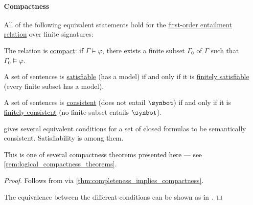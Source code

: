 \paragraph{Compactness}

\begin{theorem}\label{thm:fol_semantic_compactness}
  All of the following equivalent statements hold for the \hyperref[def:fol_semantics/entailment]{first-order entailment relation} over finite signatures:
  \begin{thmenum}
     The relation is \hyperref[def:consequence_relation/compactness]{compact}: if \( \Gamma \vDash \varphi \), there exists a finite subset \( \Gamma_0 \) of \( \Gamma \) such that \( \Gamma_0 \vDash \varphi \).

     A set of sentences is \hyperref[def:fol_semantics/satisfaction]{satisfiable} (has a model) if and only if it is \hyperref[def:finitely_satisfiable_set_of_sentences]{finitely satisfiable} (every finite subset has a model).

     A set of sentences is \hyperref[def:fol_theory/consistent]{consistent} (does not entail \( \synbot \)) if and only if it is \hyperref[def:finitely_consistent_set_of_sentences]{finitely consistent} (no finite subset entails \( \synbot \)).
  \end{thmenum}
\end{theorem}
\begin{comments}
  \item {} gives several equivalent conditions for a set of closed formulas to be semantically consistent. Satisfiability is among them.

  \item This is one of several compactness theorems presented here --- see \cref{rem:logical_compactness_theorems}.
\end{comments}
\begin{proof}
   Follows from  via \cref{thm:completeness_implies_compactness}.

  The equivalence between the different conditions can be shown as in .
\end{proof}

